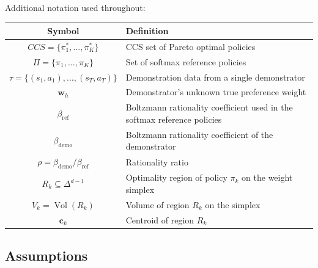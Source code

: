 \documentclass[11pt]{article}
\DeclareMathOperator{\Vol}{Vol}
\begin{document}
Additional notation used throughout:

\begin{center}
\renewcommand{\arraystretch}{1.3}
\begin{tabular}{cl}
    \hline
    \textbf{Symbol} & \textbf{Definition} \\
    \hline
    $CCS = \{\pi^*_1, \ldots, \pi^*_K\}$ & CCS set of Pareto optimal policies \\
    $\Pi = \{\pi_1, \ldots, \pi_K\}$ & Set of softmax reference policies \\
    $\tau = \{(s_1, a_1), \ldots, (s_T, a_T)\}$ & Demonstration data from a single demonstrator \\
    $\mathbf{w}_h$ & Demonstrator's unknown true preference weight \\
    $\beta_{\text{ref}}$ & Boltzmann rationality coefficient used in the softmax reference policies \\
    $\beta_{\text{demo}}$ & Boltzmann rationality coefficient of the demonstrator \\
    $\rho = \beta_{\text{demo}} / \beta_{\text{ref}}$ & Rationality ratio \\
    $R_k \subseteq \Delta^{d-1}$ & Optimality region of policy $\pi_k$ on the weight simplex \\
    $V_k = \Vol(R_k)$ & Volume of region $R_k$ on the simplex \\
    $\mathbf{c}_k$ & Centroid of region $R_k$ \\
    \hline
\end{tabular}
\end{center}

\subsection*{Assumptions}
\end{document}
